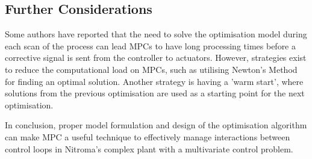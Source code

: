 \subsection{Further Considerations}
Some authors have reported that the need to solve the optimisation model during each scan of the process can lead MPCs to have long processing times before a corrective signal is sent from the controller to actuators. However, strategies exist to reduce the computational load on MPCs, such as utilising Newton's Method for finding an optimal solution. Another strategy is having a 'warm start', where solutions from the previous optimisation are used as a starting point for the next optimisation.

In conclusion, proper model formulation and design of the optimisation algorithm can make MPC a useful technique to effectively manage interactions between control loops in Nitroma's complex plant with a multivariate control problem.